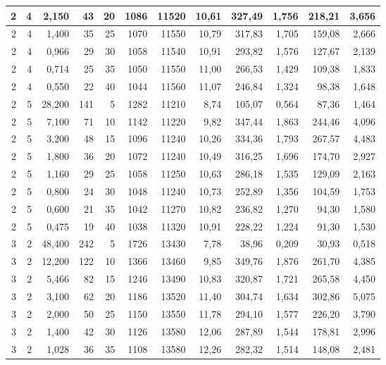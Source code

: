 \begin{tabular}{rrrrrrrrrrrr}
2 & 4 & 2,150 & 43 & 20 & 1086 & 11520 & 10,61 & 327,49 & 1,756 & 218,21 & 3,656 \\ \hline
2 & 4 & 1,400 & 35 & 25 & 1070 & 11550 & 10,79 & 317,83 & 1,705 & 159,08 & 2,666 \\ \hline
2 & 4 & 0,966 & 29 & 30 & 1058 & 11540 & 10,91 & 293,82 & 1,576 & 127,67 & 2,139 \\ \hline
2 & 4 & 0,714 & 25 & 35 & 1050 & 11550 & 11,00 & 266,53 & 1,429 & 109,38 & 1,833 \\ \hline
2 & 4 & 0,550 & 22 & 40 & 1044 & 11560 & 11,07 & 246,84 & 1,324 & 98,38 & 1,648 \\ \hline
2 & 5 & 28,200 & 141 & 5 & 1282 & 11210 & 8,74 & 105,07 & 0,564 & 87,36 & 1,464 \\ \hline
2 & 5 & 7,100 & 71 & 10 & 1142 & 11220 & 9,82 & 347,44 & 1,863 & 244,46 & 4,096 \\ \hline
2 & 5 & 3,200 & 48 & 15 & 1096 & 11240 & 10,26 & 334,36 & 1,793 & 267,57 & 4,483 \\ \hline
2 & 5 & 1,800 & 36 & 20 & 1072 & 11240 & 10,49 & 316,25 & 1,696 & 174,70 & 2,927 \\ \hline
2 & 5 & 1,160 & 29 & 25 & 1058 & 11250 & 10,63 & 286,18 & 1,535 & 129,09 & 2,163 \\ \hline
2 & 5 & 0,800 & 24 & 30 & 1048 & 11240 & 10,73 & 252,89 & 1,356 & 104,59 & 1,753 \\ \hline
2 & 5 & 0,600 & 21 & 35 & 1042 & 11270 & 10,82 & 236,82 & 1,270 & 94,30 & 1,580 \\ \hline
2 & 5 & 0,475 & 19 & 40 & 1038 & 11320 & 10,91 & 228,22 & 1,224 & 91,30 & 1,530 \\ \hline
3 & 2 & 48,400 & 242 & 5 & 1726 & 13430 & 7,78 & 38,96 & 0,209 & 30,93 & 0,518 \\ \hline
3 & 2 & 12,200 & 122 & 10 & 1366 & 13460 & 9,85 & 349,76 & 1,876 & 261,70 & 4,385 \\ \hline
3 & 2 & 5,466 & 82 & 15 & 1246 & 13490 & 10,83 & 320,87 & 1,721 & 265,58 & 4,450 \\ \hline
3 & 2 & 3,100 & 62 & 20 & 1186 & 13520 & 11,40 & 304,74 & 1,634 & 302,86 & 5,075 \\ \hline
3 & 2 & 2,000 & 50 & 25 & 1150 & 13550 & 11,78 & 294,10 & 1,577 & 226,20 & 3,790 \\ \hline
3 & 2 & 1,400 & 42 & 30 & 1126 & 13580 & 12,06 & 287,89 & 1,544 & 178,81 & 2,996 \\ \hline
3 & 2 & 1,028 & 36 & 35 & 1108 & 13580 & 12,26 & 282,32 & 1,514 & 148,08 & 2,481 \\ \hline

\end{tabular}
